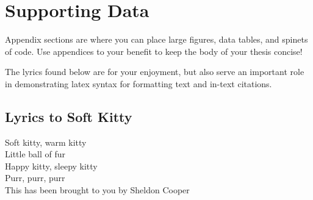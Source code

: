 \chapter{Supporting Data}

Appendix sections are where you can place large figures, data tables, and spinets of code. Use appendices to your benefit to keep the body of your thesis concise!

The lyrics found below are for your enjoyment, but also serve an important role in demonstrating latex syntax for formatting text and in-text citations.  

\section{Lyrics to Soft Kitty}

\begin{center}
\mbox{}
Soft kitty, warm kitty\\
Little ball of fur\\
Happy kitty, sleepy kitty\\
Purr, purr, purr\\[0.5in]

This has been brought to you by Sheldon Cooper \cite{BigBang}
\end{center}

\clearpage